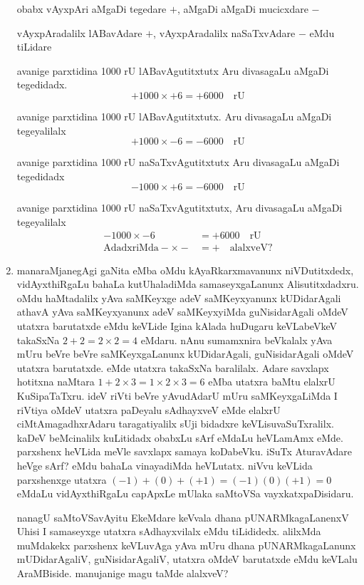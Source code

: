 \begin{enumerate}[\rm 1]
obabx vAyxpAri aMgaDi tegedare $+$, aMgaDi aMgaDi mucicxdare $-$

vAyxpAradalilx lABavAdare $+$, vAyxpAradalilx naSaTxvAdare $-$ eMdu tiLidare 

avanige parxtidina {\rm 1000} rU lABavAgutitxtutx Aru divasagaLu aMgaDi tegedidadx.
$$
+1000\times +6=+6000 \quad \text{rU}
$$

avanige parxtidina {\rm 1000} rU lABavAgutitxtutx. Aru divasagaLu aMgaDi tegeyalilalx
$$
+1000\times -6=-6000  \quad \text{rU}
$$

avanige parxtidina {\rm 1000} rU naSaTxvAgutitxtutx Aru divasagaLu aMgaDi tegedidadx 
$$
-1000\times +6=-6000  \quad \text{rU}
$$

avanige parxtidina {\rm 1000} rU naSaTxvAgutitxtutx, Aru divasagaLu aMgaDi tegeyalilalx
\begin{align*}
-1000\times -6&=+6000 \quad \text{rU}\\
\text{AdadxriMda} -\times -&=+ \quad \text{alalxveV?}
\end{align*}

\item manaraMjanegAgi gaNita eMba oMdu kAyaRkarxmavanunx niVDutitxdedx, vidAyxthiRgaLu bahaLa kutUhaladiMda samaseyxgaLanunx Alisutitxdadxru. oMdu haMtadalilx yAva saMKeyxge adeV saMKeyxyanunx kUDidarAgali athavA yAva saMKeyxyanunx adeV saMKeyxyiMda guNisidarAgali oMdeV utatxra barutatxde eMdu keVLide Igina kAlada huDugaru keVLabeVkeV takaSxNa $2+2=2\times 2=4$ eMdaru. nAnu sumamxnira beVkalalx yAva mUru beVre beVre saMKeyxgaLanunx kUDidarAgali, guNisidarAgali oMdeV utatxra barutatxde. eMde utatxra takaSxNa baralilalx. Adare savxlapx hotitxna naMtara $1+2\times 3=1\times 2\times 3=6$ eMba utatxra baMtu elalxrU KuSipaTaTxru. ideV riVti beVre yAvudAdarU mUru saMKeyxgaLiMda I riVtiya oMdeV utatxra paDeyalu sAdhayxveV eMde elalxrU ciMtAmagadhxrAdaru taragatiyalilx sUji bidadxre keVLisuvaSuTxralilx. kaDeV beMcinalilx kuLitidadx obabxLu sArf eMdaLu heVLamAmx eMde. parxshenx heVLida meVle savxlapx samaya koDabeVku. iSuTx AturavAdare heVge sArf? eMdu bahaLa vinayadiMda heVLutatx. niVvu keVLida parxshenxge utatxra $(-1)+(0)+(+1)=(-1)(0)(+1)=0$ eMdaLu vidAyxthiRgaLu capApxLe mUlaka saMtoVSa vayxkatxpaDisidaru. 

nanagU saMtoVSavAyitu EkeMdare keVvala dhana pUNARMkagaLanenxV Uhisi I samaseyxge utatxra sAdhayxvilalx eMdu tiLididedx. alilxMda muMdakekx parxshenx keVLuvAga yAva mUru dhana pUNARMkagaLanunx mUDidarAgaliV, guNisidarAgaliV, utatxra oMdeV barutatxde eMdu keVLalu AraMBiside. manujanige magu taMde alalxveV?
\end{enumerate}






